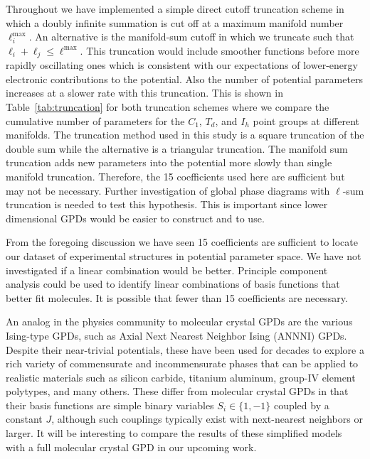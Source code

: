 \documentclass[preprint]{iucr}              %
\begin{document}
Throughout we have implemented a simple direct cutoff truncation
scheme in which a doubly infinite summation is cut off at a maximum
manifold number $\ell_i^\mathrm{max}$.  An alternative is the
manifold-sum cutoff in which we truncate such that $\ell_i+\ell_j\le
\ell^\mathrm{max}$. This truncation would include smoother functions
before more rapidly oscillating ones which is consistent with our
expectations of lower-energy electronic contributions to the
potential. Also the number of potential parameters increases at a
slower rate with this truncation. This is shown in
Table~\ref{tab:truncation} for both truncation schemes where we
compare the cumulative number of parameters for the $C_1$, $T_d$,
and $I_h$ point groups at different manifolds. The truncation method
used in this study is a square truncation of the double sum while
the alternative is a triangular truncation. The manifold sum
truncation adds new parameters into the potential more slowly than
single manifold truncation. Therefore, the 15 coefficients used here
are sufficient but may not be necessary. Further investigation of
global phase diagrams with $\ell$-sum truncation is needed to test
this hypothesis. This is important since lower dimensional GPDs
would be easier to construct and to use.

From the foregoing discussion we have seen 15 coefficients are
sufficient to locate our dataset of experimental
structures in potential parameter space.  We have not investigated if a linear
combination would be better.  Principle component analysis could be used to
identify linear combinations of basis functions that better fit molecules. It
is possible that fewer than 15 coefficients are necessary. 

An analog in the physics community to molecular crystal GPDs are the various
Ising-type GPDs, such as Axial Next Nearest Neighbor Ising (ANNNI) GPDs. 
Despite their near-trivial potentials, these have been used for decades
to explore a rich variety of commensurate and incommensurate
phases\cite{Gendiar05,Kasama06,Muraoka99,Sato99,Kim95} that can be applied to
realistic materials such as silicon carbide, titanium aluminum, group-IV
element polytypes, and many others\cite{Wong-Leung05,Colinet02,Raffy02}. These
differ from molecular crystal GPDs in that their basis functions are simple binary
variables $S_i\in \{1,-1\}$ coupled by a constant $J$, although such couplings
typically exist with next-nearest neighbors or larger. It will be
interesting to compare the results of these simplified models with a full
molecular crystal GPD in our upcoming work\cite{Keith09b}.
\end{document}
